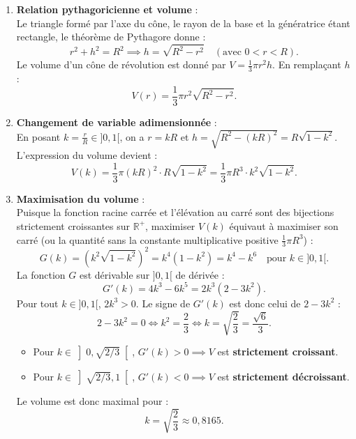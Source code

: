 \documentclass[11pt,a4paper]{article}
\newcommand{\R}{\mathbb{R}}
\begin{document}
\begin{correctionbox}
\begin{enumerate}[label=\textbf{\arabic*.}]
    \item \textbf{Relation pythagoricienne et volume} :\\
    Le triangle formé par l'axe du cône, le rayon de la base et la génératrice étant rectangle, le théorème de Pythagore donne :
    \[
    r^2 + h^2 = R^2 \implies h = \sqrt{R^2 - r^2} \quad (\text{avec } 0 < r < R).
    \]
    Le volume d'un cône de révolution est donné par $V = \frac{1}{3}\pi r^2 h$. En remplaçant $h$ :
    \[
    V(r) = \frac{1}{3}\pi r^2 \sqrt{R^2 - r^2}.
    \]

    \item \textbf{Changement de variable adimensionnée} :\\
    En posant $k = \frac{r}{R} \in ]0, 1[$, on a $r = kR$ et $h = \sqrt{R^2 - (kR)^2} = R\sqrt{1 - k^2}$.\\
    L'expression du volume devient :
    \[
    V(k) = \frac{1}{3}\pi (kR)^2 \cdot R\sqrt{1 - k^2} = \frac{1}{3}\pi R^3 \cdot k^2 \sqrt{1 - k^2}.
    \]

    \item \textbf{Maximisation du volume} :\\
    Puisque la fonction racine carrée et l'élévation au carré sont des bijections strictement croissantes sur $\R^+$, maximiser $V(k)$ équivaut à maximiser son carré (ou la quantité sans la constante multiplicative positive $\frac{1}{3}\pi R^3$) :
    \[
    G(k) = \left( k^2 \sqrt{1 - k^2} \right)^2 = k^4 (1 - k^2) = k^4 - k^6 \quad \text{pour } k \in ]0, 1[.
    \]
    La fonction $G$ est dérivable sur $]0, 1[$ de dérivée :
    \[
    G'(k) = 4k^3 - 6k^5 = 2k^3(2 - 3k^2).
    \]
    Pour tout $k \in ]0, 1[$, $2k^3 > 0$. Le signe de $G'(k)$ est donc celui de $2 - 3k^2$ :
    \[
    2 - 3k^2 = 0 \iff k^2 = \frac{2}{3} \iff k = \sqrt{\frac{2}{3}} = \frac{\sqrt{6}}{3}.
    \]
    \begin{itemize}
        \item Pour $k \in \left]0, \sqrt{2/3}\right[$, $G'(k) > 0 \implies V$ est \textbf{strictement croissant}.
        \item Pour $k \in \left]\sqrt{2/3}, 1\right[$, $G'(k) < 0 \implies V$ est \textbf{strictement décroissant}.
    \end{itemize}
    Le volume est donc maximal pour :
    \[
    k = \sqrt{\frac{2}{3}} \approx 0{,}8165.
    \]


\end{enumerate}
\end{correctionbox}
\end{document}
